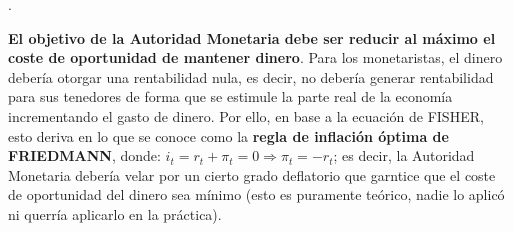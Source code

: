 \documentclass[10pt,a4paper]{article}
\newcounter{numitem}
\newenvironment{lnum}
      {\begin{list}{\arabic{numitem}.}{%
          \usecounter{numitem}%
          \setlength{\leftmargin}{1cm}%
          \setlength{\parskip}{3pt}%
          \setlength{\itemsep}{0pt}%
          \setlength{\parsep}{0pt}%
      }}
      {\end{list}}
\begin{document}
\begin{lnum}
{    }
    \item \textbf{El objetivo de la Autoridad Monetaria debe ser reducir al máximo el coste de oportunidad de mantener dinero}. Para los monetaristas, el dinero debería otorgar una rentabilidad nula, es decir, no debería generar rentabilidad para sus tenedores de forma que se estimule la parte real de la economía incrementando el gasto de dinero. Por ello, en base a la ecuación de FISHER, esto deriva en lo que se conoce como la \textbf{regla de inflación óptima de FRIEDMANN}, donde: $i_t=r_t+\pi_t=0\Longrightarrow\pi_t=-r_t$; es decir, la Autoridad Monetaria debería velar por un cierto grado deflatorio que garntice que el coste de oportunidad del dinero sea mínimo (esto es puramente teórico, nadie lo aplicó ni querría aplicarlo en la práctica).
\end{lnum}

\clearpage
\end{document}
